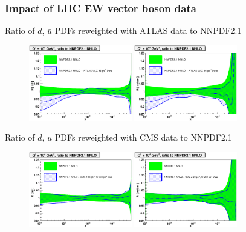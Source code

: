 \documentclass[10pt]{beamer}
\begin{document}
\begin{frame}
\frametitle{Impact of LHC EW vector boson data}
\begin{centering}
\small Ratio of $d$, $\bar{u}$ PDFs reweighted with ATLAS data to NNPDF2.1\\
\end{centering}
\begin{figure}[h]
\begin{center}
\includegraphics[width=0.40\textwidth]{xd_Q2_10000_log-atlas.eps}
\includegraphics[width=0.40\textwidth]{xubar_Q2_10000_log-atlas.eps}\\
\end{center}
\end{figure}
\begin{centering}
\small Ratio of $d$, $\bar{u}$ PDFs reweighted with CMS data to NNPDF2.1\\
\end{centering}

\begin{figure}[h]
\begin{center}
\includegraphics[width=0.40\textwidth]{xd_Q2_10000_log-cms.eps}
\includegraphics[width=0.40\textwidth]{xubar_Q2_10000_log-cms.eps}
\end{center}
\end{figure}

\end{frame}
\end{document}
